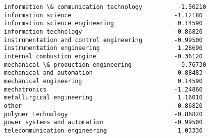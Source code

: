 \documentclass[11pt]{article}
\begin{document}
\begin{tcolorbox}[breakable, size=fbox, boxrule=.5pt, pad at break*=1mm, opacityfill=0]
\begin{Verbatim}[commandchars=\\\{\}]
information \& communication technology          -1.50210
information science                             -1.12180
information science engineering                  0.14590
information technology                          -0.86820
instrumentation and control engineering         -0.99500
instrumentation engineering                      1.28690
internal combustion engine                      -0.36120
mechanical \& production engineering              0.76730
mechanical and automation                        0.88483
mechanical engineering                           0.14590
mechatronics                                    -1.24860
metallurgical engineering                        1.16010
other                                           -0.86820
polymer technology                              -0.86820
power systems and automation                    -0.99500
telecommunication engineering                    1.03330


\end{Verbatim}
\end{tcolorbox}
\end{document}
